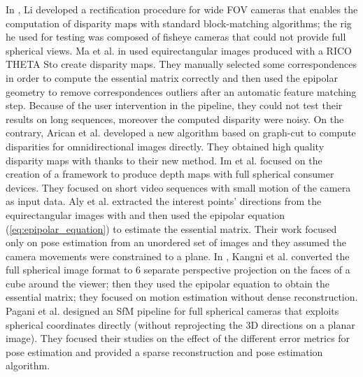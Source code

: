 In \cite{li2008binocular,li2006real}, Li developed a rectification procedure for wide
FOV cameras that enables the computation of disparity maps with standard 
block-matching algorithms; the rig he used for testing was composed of 
fisheye cameras that could not provide full spherical views.
Ma et al. in \cite{ma20153d} used equirectangular images produced with a 
RICO THETA S\registered to create disparity maps. They manually selected some 
correspondences in order to compute the essential matrix correctly and then 
used the epipolar geometry to remove correspondences outliers after an 
automatic feature matching step. Because of the user intervention in 
the pipeline, they could not test their results on long sequences, moreover the
computed disparity were noisy.
On the contrary, Arican et al. \cite{arican2007dense} developed a new algorithm
based on graph-cut to compute disparities for omnidirectional images directly.
They obtained high quality disparity maps with thanks to their new method.
Im et al. \cite{im2016all} focused on the creation of a framework to produce
depth maps 
with full spherical consumer devices. They focused on short video sequences 
with small motion of the camera as input data.
Aly et al. \cite{aly2012street} extracted the interest points' directions from the
equirectangular 
images with  and then used the 
epipolar equation (\ref{eq:epipolar_equation}) to estimate the essential matrix.
Their work focused only on pose estimation from an unordered set of images
and they assumed the camera movements were constrained to a plane.
In \cite{kangni2007orientation}, Kangni et al. converted the full spherical image format to 6 
separate perspective projection on the faces of a cube around the viewer; 
then they used the epipolar equation to obtain the essential matrix;
they focused on motion estimation without dense reconstruction.
Pagani et al. \cite{pagani2011structure} designed an SfM pipeline for full
spherical cameras that exploits spherical coordinates directly (without 
reprojecting the 3D directions on a planar image). They focused their studies on
the effect of the different error metrics for pose estimation and provided a 
sparse reconstruction and pose estimation algorithm.

